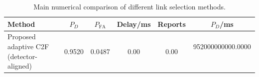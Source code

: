 \begin{table}[t]
    \centering
    \caption{Main numerical comparison of different link selection methods.}
    \label{tab:main_summary}
    \begin{tabular}{l c c c c c}
        \hline
        Method & $P_D$ & $P_{\mathrm{FA}}$ & Delay/ms & Reports & $P_D$/ms \\
        \hline
        Proposed adaptive C2F (detector-aligned) & 0.9520 & 0.0487 & 0.00 & 0.00 & 952000000000.0000 \
        \hline
    \end{tabular}
\end{table}
